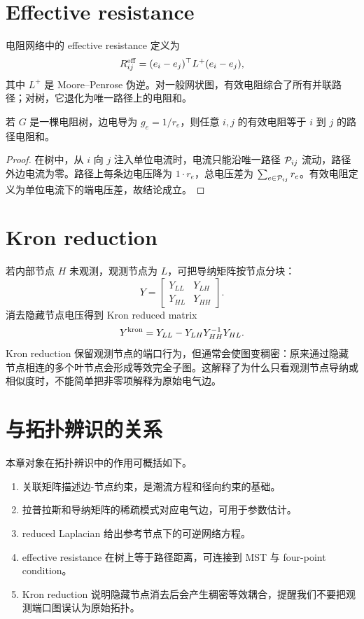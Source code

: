 \section{Effective resistance}

电阻网络中的 effective resistance 定义为
\begin{equation}
  R^{\rm eff}_{ij}=(e_i-e_j)^\top L^+(e_i-e_j),
  \label{eq:effective_resistance}
\end{equation}
其中 $L^+$ 是 Moore--Penrose 伪逆。对一般网状图，有效电阻综合了所有并联路径；对树，它退化为唯一路径上的电阻和。

\begin{proposition}[树上的有效电阻等于路径电阻]
\label{prop:effective_tree_path}
若 $G$ 是一棵电阻树，边电导为 $g_e=1/r_e$，则任意 $i,j$ 的有效电阻等于 $i$ 到 $j$ 的路径电阻和。
\end{proposition}

\begin{proof}
在树中，从 $i$ 向 $j$ 注入单位电流时，电流只能沿唯一路径 $\mathcal{P}_{ij}$ 流动，路径外边电流为零。路径上每条边电压降为 $1\cdot r_e$，总电压差为 $\sum_{e\in\mathcal{P}_{ij}}r_e$。有效电阻定义为单位电流下的端电压差，故结论成立。
\end{proof}

\section{Kron reduction}

若内部节点 $H$ 未观测，观测节点为 $L$，可把导纳矩阵按节点分块：
\begin{equation}
  Y=
  \begin{bmatrix}
    Y_{LL} & Y_{LH}\\
    Y_{HL} & Y_{HH}
  \end{bmatrix}.
\end{equation}
消去隐藏节点电压得到 Kron reduced matrix
\begin{equation}
  Y^{\rm kron}=Y_{LL}-Y_{LH}Y_{HH}^{-1}Y_{HL}.
  \label{eq:kron_reduction}
\end{equation}
Kron reduction 保留观测节点的端口行为，但通常会使图变稠密：原来通过隐藏节点相连的多个叶节点会形成等效完全子图。这解释了为什么只看观测节点导纳或相似度时，不能简单把非零项解释为原始电气边。

\section{与拓扑辨识的关系}

本章对象在拓扑辨识中的作用可概括如下。
\begin{enumerate}[label=(\arabic*)]
  \item 关联矩阵描述边-节点约束，是潮流方程和径向约束的基础。
  \item 拉普拉斯和导纳矩阵的稀疏模式对应电气边，可用于参数估计。
  \item reduced Laplacian 给出参考节点下的可逆网络方程。
  \item effective resistance 在树上等于路径距离，可连接到 MST 与 four-point condition。
  \item Kron reduction 说明隐藏节点消去后会产生稠密等效耦合，提醒我们不要把观测端口图误认为原始拓扑。
\end{enumerate}

